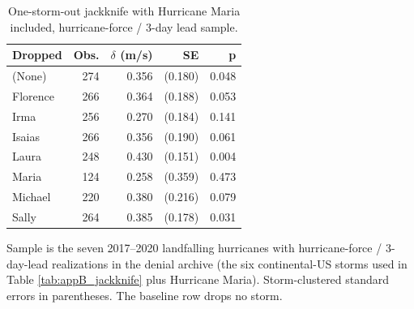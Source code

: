 \begin{table}

\caption{One-storm-out jackknife with Hurricane Maria included, hurricane-force / 3-day lead sample. \label{tab:appB_jackknife_maria}}
\centering
\begin{threeparttable}
\begin{tabular}[t]{lrrrr}
\toprule
Dropped & Obs. & $\delta$ (m/s) & SE & p\\
\midrule
(None) & 274 & 0.356 & (0.180) & 0.048\\
Florence & 266 & 0.364 & (0.188) & 0.053\\
Irma & 256 & 0.270 & (0.184) & 0.141\\
Isaias & 266 & 0.356 & (0.190) & 0.061\\
Laura & 248 & 0.430 & (0.151) & 0.004\\
Maria & 124 & 0.258 & (0.359) & 0.473\\
Michael & 220 & 0.380 & (0.216) & 0.079\\
Sally & 264 & 0.385 & (0.178) & 0.031\\
\bottomrule
\end{tabular}
\begin{tablenotes}
\small
\item Sample is the seven 2017--2020 landfalling hurricanes with hurricane-force / 3-day-lead realizations in the denial archive (the six continental-US storms used in Table \ref{tab:appB_jackknife} plus Hurricane Maria). Storm-clustered standard errors in parentheses. The baseline row drops no storm.
\end{tablenotes}
\end{threeparttable}
\end{table}

